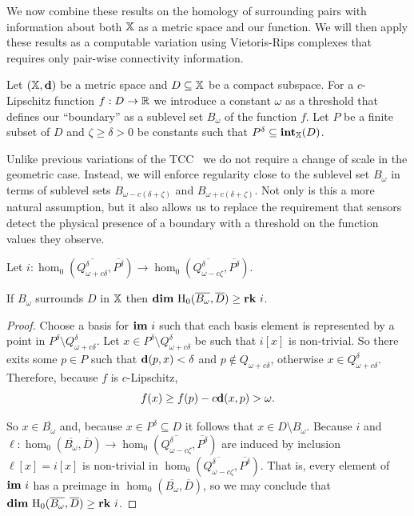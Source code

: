 
We now combine these results on the homology of surrounding pairs with information about both $\mathbb{X}$ as a metric space and our function.
We will then apply these results as a computable variation using Vietoris-Rips complexes that requires only pair-wise connectivity information.

Let $(\mathbb{X},\mathbf{d})$ be a metric space and $D\subseteq \mathbb{X}$ be a compact subspace.
For a $c$-Lipschitz function $f : D\to \mathbb{R}$ we introduce a constant $\omega$ as a threshold that defines our ``boundary'' as a sublevel set $B_\omega$ of the function $f$.
Let $P$ be a finite subset of $D$ and $\zeta\geq\delta > 0 $ be constants such that $P^\delta\subseteq \mathbf{int}_{\mathbb{X}}(D)$.

Unlike previous variations of the TCC~\cite{cavanna2017when} we do not require a change of scale in the geometric case.
Instead, we will enforce regularity close to the sublevel set $B_\omega$ in terms of sublevel sets $B_{\omega-c(\delta+\zeta)}$ and $B_{\omega+c(\delta+\zeta)}$.
Not only is this a more natural assumption, but it also allows us to replace the requirement that sensors detect the physical presence of a boundary with a threshold on the function values they observe.


\begin{lemma}\label{lem:psurj}
  Let $i : \hom_0(\overline{Q_{\omega+c\delta}^\delta}, \overline{P^\delta})\to \hom_0(\overline{Q_{\omega-c\zeta}^\delta}, \overline{P^\delta})$.

  If $B_\omega$ surrounds $D$ in $\mathbb{X}$ then $\mathbf{dim}~\mathrm{H}_0(\overline{B_\omega}, \overline{D})\geq \mathbf{rk}~i$.
\end{lemma}
\begin{proof}
  Choose a basis for $\mathbf{im}~i$ such that each basis element is represented by a point in $P^\delta\setminus Q_{\omega+c\delta}^\delta$.
  Let $x\in P^\delta\setminus Q_{\omega+c\delta}^\delta$ be such that $i[x]$ is non-trivial.
  So there exits some $p\in P$ such that $\mathbf{d}(p, x) < \delta$ and $p\notin Q_{\omega+c\delta}$, otherwise $x\in Q_{\omega+c\delta}^\delta$.
  Therefore, because $f$ is $c$-Lipschitz,
  \[ f(x)\geq f(p) - c\mathbf{d}(x, p) > \omega.\]

  So $x\in\overline{B_\omega}$ and, because $x\in P^\delta\subseteq D$ it follows that $x\in D\setminus B_\omega$.
  Because $i$ and $\ell : \hom_0(\overline{B_\omega}, \overline{D})\to \hom_0(\overline{Q_{\omega-c\zeta}^\delta}, \overline{P^\delta})$ are induced by inclusion $\ell[x] = i[x]$ is non-trivial in $\hom_0(\overline{Q_{\omega-c\zeta}^\delta}, \overline{P^\delta})$.
  That is, every element of $\mathbf{im}~i$ has a preimage in $\hom_0(\overline{B_\omega}, \overline{D})$, so we may conclude that $\mathbf{dim}~\mathrm{H}_0(\overline{B_\omega}, \overline{D})\geq \mathbf{rk}~i$.
\end{proof}

